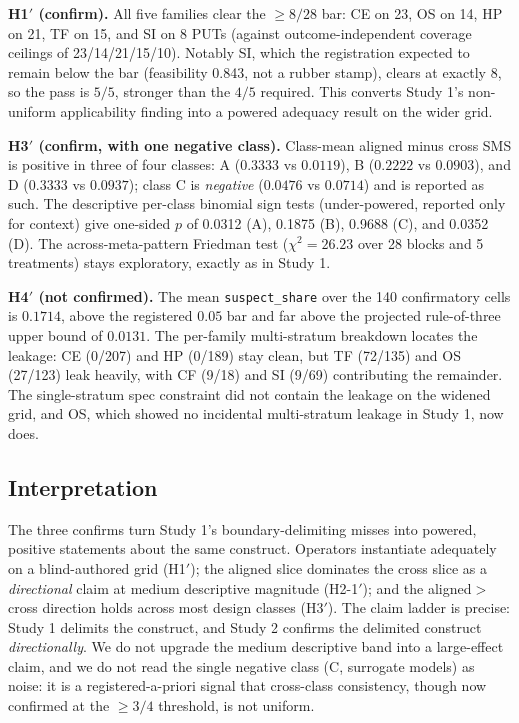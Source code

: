 \documentclass[manuscript,screen,review]{acmart}
\begin{document}
\textbf{H1\('\) (confirm).} All five families clear the \(\geq 8/28\)
bar: CE on 23, OS on 14, HP on 21, TF on 15, and SI on 8 PUTs (against
outcome-independent coverage ceilings of 23/14/21/15/10). Notably SI,
which the registration expected to remain below the bar (feasibility
0.843, not a rubber stamp), clears at exactly 8, so the pass is
\(5/5\), stronger than the \(4/5\) required. This converts Study 1's
non-uniform applicability finding into a powered adequacy result on the
wider grid.

\textbf{H3\('\) (confirm, with one negative class).} Class-mean aligned
minus cross SMS is positive in three of four classes: A
(\(0.3333\) vs \(0.0119\)), B (\(0.2222\) vs \(0.0903\)), and D
(\(0.3333\) vs \(0.0937\)); class C is \emph{negative}
(\(0.0476\) vs \(0.0714\)) and is reported as such. The descriptive
per-class binomial sign tests (under-powered, reported only for context)
give one-sided \(p\) of 0.0312 (A), 0.1875 (B), 0.9688 (C), and 0.0352
(D). The across-meta-pattern Friedman test
(\(\chi^2 = 26.23\) over 28 blocks and 5 treatments) stays exploratory,
exactly as in Study 1.

\textbf{H4\('\) (not confirmed).} The mean \texttt{suspect\_share} over
the 140 confirmatory cells is \(0.1714\), above the registered \(0.05\)
bar and far above the projected rule-of-three upper bound of \(0.0131\).
The per-family multi-stratum breakdown locates the leakage: CE
(0/207) and HP (0/189) stay clean, but TF (72/135) and OS (27/123) leak
heavily, with CF (9/18) and SI (9/69) contributing the remainder. The
single-stratum spec constraint did not contain the leakage on the widened
grid, and OS, which showed no incidental multi-stratum leakage in Study
1, now does.

\subsection{Interpretation}\label{study2-interpretation}

The three confirms turn Study 1's boundary-delimiting misses into
powered, positive statements about the same construct. Operators
instantiate adequately on a blind-authored grid (H1\('\)); the aligned
slice dominates the cross slice as a \emph{directional} claim at medium
descriptive magnitude (H2-1\('\)); and the aligned\(>\)cross direction
holds across most design classes (H3\('\)). The claim ladder is precise:
Study 1 delimits the construct, and Study 2 confirms the delimited
construct \emph{directionally}. We do not upgrade the medium descriptive
band into a large-effect claim, and we do not read the single negative
class (C, surrogate models) as noise: it is a registered-a-priori signal
that cross-class consistency, though now confirmed at the \(\geq 3/4\)
threshold, is not uniform.
\end{document}
